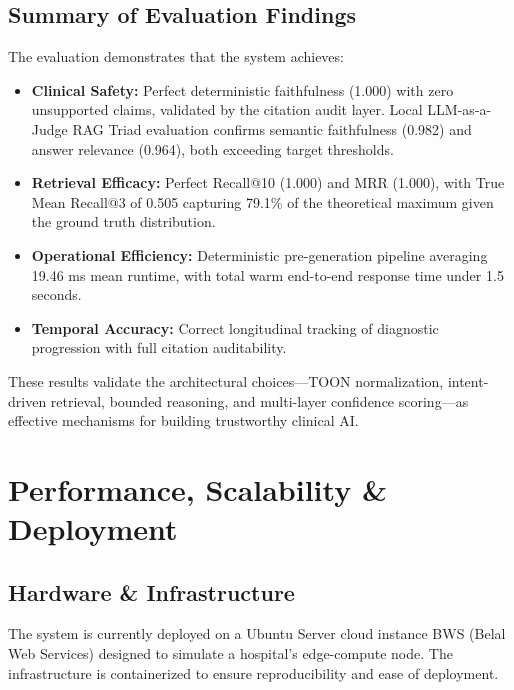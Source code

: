 \subsection{Summary of Evaluation Findings}
The evaluation demonstrates that the system achieves:
\begin{itemize}
    \item \textbf{Clinical Safety:} Perfect deterministic faithfulness (1.000) with zero unsupported claims, validated by the citation audit layer. Local LLM-as-a-Judge RAG Triad evaluation confirms semantic faithfulness (0.982) and answer relevance (0.964), both exceeding target thresholds.
    \item \textbf{Retrieval Efficacy:} Perfect Recall@10 (1.000) and MRR (1.000), with True Mean Recall@3 of 0.505 capturing 79.1\% of the theoretical maximum given the ground truth distribution.
    \item \textbf{Operational Efficiency:} Deterministic pre-generation pipeline averaging 19.46 ms mean runtime, with total warm end-to-end response time under 1.5 seconds.
    \item \textbf{Temporal Accuracy:} Correct longitudinal tracking of diagnostic progression with full citation auditability.
\end{itemize}

These results validate the architectural choices—TOON normalization, intent-driven retrieval, bounded reasoning, and multi-layer confidence scoring—as effective mechanisms for building trustworthy clinical AI.


\section{Performance, Scalability \& Deployment}
\label{sec:performance}

\subsection{Hardware \& Infrastructure}
The system is currently deployed on a Ubuntu Server cloud instance BWS (Belal Web Services) designed to simulate a hospital's edge-compute node. The infrastructure is containerized to ensure reproducibility and ease of deployment.

